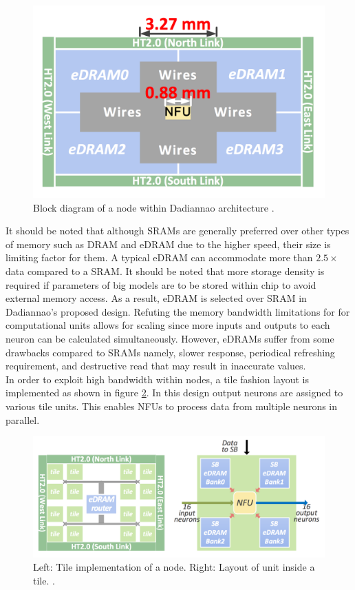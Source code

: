 \documentclass[runningheads,a4paper]{llncs}
\begin{document}
\begin{figure}[h]
	\includegraphics[scale=0.42]{./images/NFU_diagram.png}
	\centering
	\caption{Block diagram of a node within Dadiannao architecture \cite{chen2014dadiannao}.}
	\label{fig:NFU_Diagram}
\end{figure}
It should be noted that although SRAMs are generally preferred over other types of memory such as DRAM and eDRAM due to the higher speed, their size is limiting factor for them. A typical eDRAM can accommodate more than $2.5\times$ data compared to a SRAM. It should be noted that more storage density is required if parameters of big models are to be stored within chip to avoid external memory access. As a result, eDRAM is selected over SRAM in Dadiannao's proposed design. Refuting the memory bandwidth limitations for for computational units allows for scaling since more inputs and outputs to each neuron can be calculated simultaneously. However, eDRAMs suffer from some drawbacks compared to SRAMs namely, slower response, periodical refreshing requirement, and destructive read that may result in inaccurate values.\\

In order to exploit high bandwidth within nodes, a tile fashion layout is implemented as shown in figure \ref{fig:tiles}. In this design output neurons are assigned to various tile units. This enables NFUs to process data from multiple neurons in parallel.
\begin{figure}[h]
	\includegraphics[scale=0.42]{./images/tiles.png}
	\centering
	\caption{Left: Tile implementation of a node. Right: Layout of unit inside a tile. \cite{chen2014dadiannao}.}
	\label{fig:tiles}
\end{figure}
\end{document}
